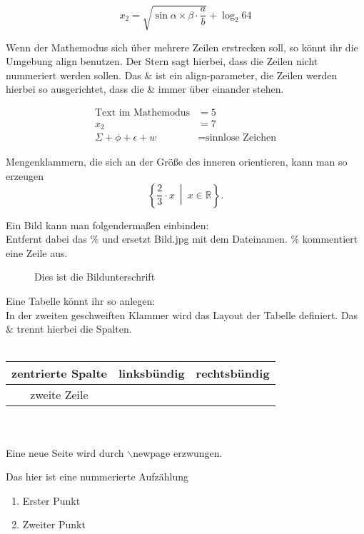 \documentclass[a4paper]{scrartcl}
\begin{document}
\[x_2 = \sqrt{ \sin{ \alpha \times \beta} \cdot \frac{a}{b}} + \log_2{64}\]

Wenn der Mathemodus sich über mehrere Zeilen erstrecken soll, so könnt ihr die 
Umgebung align benutzen. Der Stern sagt hierbei, dass die Zeilen nicht nummeriert 
werden sollen. Das \& ist ein align-parameter, die Zeilen werden hierbei so ausgerichtet, 
dass die \& immer über einander stehen.

\begin{align*}
\text{Text im Mathemodus} & = 5\\
x_2 &= 7\\
\Sigma + \phi + \epsilon + w &= \text{sinnlose Zeichen}
\end{align*}

Mengenklammern, die sich an der Größe des inneren orientieren, kann man so erzeugen
\[\left\{ \frac{2}{3} \cdot x \ \middle| \ x \in \mathbb{R} \right\} .\]


Ein Bild kann man folgendermaßen einbinden: \\
Entfernt dabei das \% und ersetzt Bild.jpg mit dem Dateinamen. \% kommentiert 
eine Zeile aus.

\begin{figure}[H]
\centering
\caption{Dies ist die Bildunterschrift}
\end{figure}

Eine Tabelle könnt ihr so anlegen:\\
In der zweiten geschweiften Klammer wird das Layout der Tabelle definiert. 
Das \& trennt hierbei die Spalten.\\
\ \\ %
\begin{tabular}{c|lr}
  zentrierte Spalte & linksbündig & rechtsbündig\\
  \hline
  zweite Zeile & \\
\end{tabular}\\
\ \\
Eine neue Seite wird durch $\backslash$newpage erzwungen.
\newpage

Das hier ist eine nummerierte Aufzählung
\begin{enumerate}
\item Erster Punkt
\item Zweiter Punkt
\end{enumerate}
\end{document}
